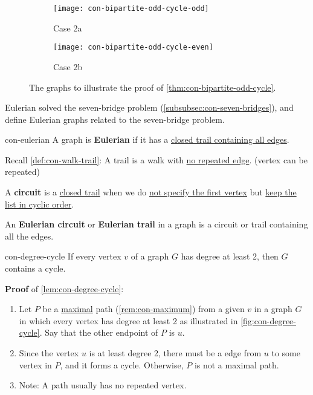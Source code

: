 \documentclass[../src/handouts/main.tex]{subfiles}
\begin{document}
\begin{figure}[htbp]
  \centering
  \begin{subfigure}[t]{.3\textwidth}
    \centering
    \texttt{[image: con-bipartite-odd-cycle-odd]}
    \caption{Case 2a}
    \label{fig:con-bipartite-odd-cycle-odd}
  \end{subfigure}
  \hspace{.2\textwidth}
  \begin{subfigure}[t]{.3\textwidth}
    \centering
    \texttt{[image: con-bipartite-odd-cycle-even]}
    \caption{Case 2b}
    \label{fig:con-bipartite-odd-cycle-even}
  \end{subfigure}
  \caption{The graphs to illustrate the proof of \cref{thm:con-bipartite-odd-cycle}.}
  \label{fig:con-bipartite-odd-cycle}
\end{figure}

Eulerian solved the seven-bridge problem (\cref{subsubsec:con-seven-bridges}), and define Eulerian graphs related to the seven-bridge problem.

\begin{definition}{}{con-eulerian}
  A graph is \textbf{Eulerian} if it has a \underline{closed trail containing all edges}.

  Recall \cref{def:con-walk-trail}: A trail is a walk with \underline{no repeated edge}. (vertex can be repeated)

  A \textbf{circuit} is a \ul{closed trail} when we do \ul{not specify the first vertex} but \ul{keep the list in cyclic order}.

  An \textbf{Eulerian circuit} or \textbf{Eulerian trail} in a graph is a circuit or trail containing all the edges.
\end{definition}

\begin{lemma}{}{con-degree-cycle}
  If every vertex $v$ of a graph $G$ has degree at least 2, then $G$ contains a cycle.
\end{lemma}

\textbf{Proof} of \cref{lem:con-degree-cycle}:
\begin{enumerate}
  \item Let $P$ be a \underline{maximal} path (\cref{rem:con-maximum}) from a given $v$ in a graph $G$ in which every vertex has degree at least 2 as illustrated in \cref{fig:con-degree-cycle}. Say that the other endpoint of $P$ is $u$.
  \item Since the vertex $u$ is at least degree 2, there must be a edge from $u$ to some vertex in $P$, and it forms a cycle. Otherwise, $P$ is not a maximal path.
  \item Note: A path usually has no repeated vertex.
\end{enumerate}
\end{document}

